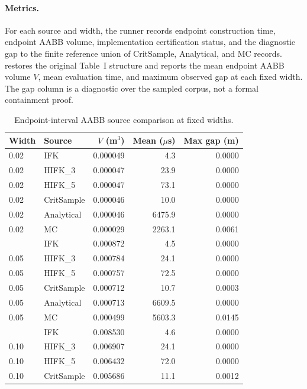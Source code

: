 \documentclass[journal]{IEEEtran}
\begin{document}
\paragraph{Metrics.}
For each source and width, the runner records endpoint construction time,
endpoint AABB volume, implementation certification status, and the diagnostic
gap to the finite reference union of CritSample, Analytical, and MC records.
 restores the original Table~I structure and
reports the mean endpoint AABB volume $V$, mean evaluation time, and maximum
observed gap at each fixed width. The gap column is a diagnostic over the
sampled corpus, not a formal containment proof.

\begin{table}[t]
  \centering
  \caption{Endpoint-interval AABB source comparison at fixed widths.}
  \label{tab:exp1_endpoint_envelopes}
  \scriptsize
  \setlength{\tabcolsep}{2.0pt}
  \renewcommand{\arraystretch}{0.76}
  \begin{tabular}{@{}llrrr@{}}
    \toprule
    Width & Source & $V$ (m$^3$) & Mean ($\mu$s) & Max gap (m) \\
    \midrule
    0.02 & IFK & 0.000049 & 4.3 & 0.0000 \\
    0.02 & HIFK\_3 & 0.000047 & 23.9 & 0.0000 \\
    0.02 & HIFK\_5 & 0.000047 & 73.1 & 0.0000 \\
    0.02 & CritSample & 0.000046 & 10.0 & 0.0000 \\
    0.02 & Analytical & 0.000046 & 6475.9 & 0.0000 \\
    0.02 & MC & 0.000029 & 2263.1 & 0.0061 \\
    \addlinespace
    0.05 & IFK & 0.000872 & 4.5 & 0.0000 \\
    0.05 & HIFK\_3 & 0.000784 & 24.1 & 0.0000 \\
    0.05 & HIFK\_5 & 0.000757 & 72.5 & 0.0000 \\
    0.05 & CritSample & 0.000712 & 10.7 & 0.0003 \\
    0.05 & Analytical & 0.000713 & 6609.5 & 0.0000 \\
    0.05 & MC & 0.000499 & 5603.3 & 0.0145 \\
    \addlinespace
    0.10 & IFK & 0.008530 & 4.6 & 0.0000 \\
    0.10 & HIFK\_3 & 0.006907 & 24.1 & 0.0000 \\
    0.10 & HIFK\_5 & 0.006432 & 72.0 & 0.0000 \\
    0.10 & CritSample & 0.005686 & 11.1 & 0.0012 \\

\end{tabular}
\end{table}
\end{document}
